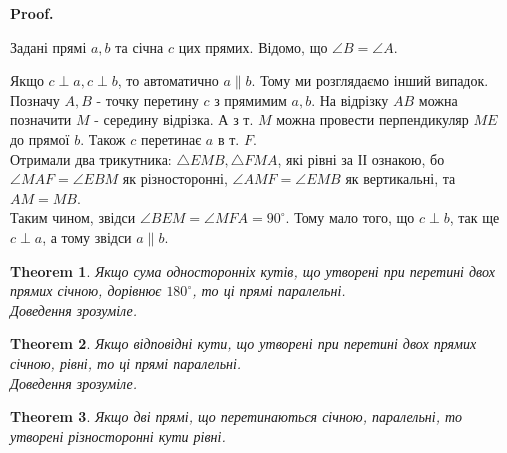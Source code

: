 \documentclass[a4paper, 10pt]{article}
\makeatletter
\def\qed{$\blacksquare$}
\theoremstyle{theoremdd}
\newtheorem{theorem}{Theorem}[subsection]
\theoremstyle{theoremdd}
\theoremstyle{theoremdd}
\theoremstyle{theoremdd}
\theoremstyle{theoremdd}
\theoremstyle{theoremdd}
\theoremstyle{theoremdd}
\theoremstyle{theoremdd}
\theoremstyle{theoremdd}
\renewenvironment{proof}[1][Proof.\\]{\par
\pushQED{\hfill \qed}%
\normalfont \topsep6\p@\@plus6\p@\relax
\trivlist
\item\relax
{\bfseries
#1\@addpunct{.}}\hspace\labelsep\ignorespaces
}{%
\popQED\endtrivlist\@endpefalse
}
\makeatother
\begin{document}
\begin{proof}
Задані прямі $a,b$ та січна $c$ цих прямих. Відомо, що $\angle B = \angle A$.
\begin{figure}[H]
\centering
{}
\end{figure}
Якщо $c \perp a, c \perp b$, то автоматично $a \parallel b$. Тому ми розглядаємо інший випадок.\\
Позначу $A,B$ - точку перетину $c$ з прямимим $a,b$. На відрізку $AB$ можна позначити $M$ - середину відрізка. А з т. $M$ можна провести перпендикуляр $ME$ до прямої $b$. Також $c$ перетинає $a$ в т. $F$.\\
Отримали два трикутника: $\triangle EMB, \triangle FMA$, які рівні за ІІ ознакою, бо $\angle MAF = \angle EBM$ як різносторонні, $\angle AMF = \angle EMB$ як вертикальні, та $AM = MB$.\\
Таким чином, звідси $\angle BEM = \angle MFA = 90^\circ$. Тому мало того, що $c \perp b$, так ще $c \perp a$, а тому звідси $a \parallel b$.
\end{proof}

\begin{theorem}
Якщо сума односторонніх кутів, що утворені при перетині двох прямих січною, дорівнює $180^\circ$, то ці прямі паралельні.\\
\textit{Доведення зрозуміле.}
\end{theorem}

\begin{theorem}
Якщо відповідні кути, що утворені при перетині двох прямих січною, рівні, то ці прямі паралельні.\\
\textit{Доведення зрозуміле.}
\end{theorem}

\begin{theorem}
Якщо дві прямі, що перетинаються січною, паралельні, то утворені різносторонні кути рівні.
\end{theorem}
\end{document}
